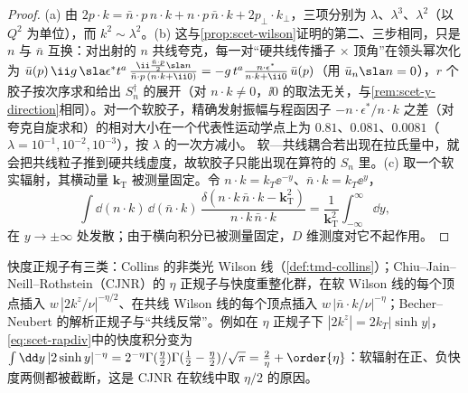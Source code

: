 \begin{proof}
(a) 由 $2p\cdot k=\bar n\cdot p\,n\cdot k+n\cdot p\,\bar n\cdot k+2p_\perp\cdot k_\perp$，三项分别为 $\lambda$、$\lambda^3$、$\lambda^2$（以 $Q^2$ 为单位），而 $k^2\sim\lambda^2$。(b) 这与\cref{prop:scet-wilson}证明的第二、三步相同，只是 $n$ 与 $\bar n$ 互换：对出射的 $n$ 共线夸克，每一对“硬共线传播子 × 顶角”在领头幂次化为 $\bar u(p)\,\ii g\,\sla\epsilon^*t^a\,\frac{\ii\frac{\bar n\cdot p}{2}\sla n}{\bar n\cdot p\,(n\cdot k+\ii0)}=-g\,t^a\frac{n\cdot\epsilon^*}{n\cdot k+\ii0}\,\bar u(p)$（用 $\bar u_n\sla n=0$），$r$ 个胶子按次序求和给出 $S_n^\dagger$ 的展开（对 $n\cdot k\neq0$，$\ii0$ 的取法无关，与\cref{rem:scet-y-direction}相同）。对一个软胶子，精确发射振幅与程函因子 $-n\cdot\epsilon^*/n\cdot k$ 之差（对夸克自旋求和）的相对大小在一个代表性运动学点上为 $0.81$、$0.081$、$0.0081$（$\lambda=10^{-1},10^{-2},10^{-3}$），按 $\lambda$ 的一次方减小。%
软—共线耦合若出现在拉氏量中，就会把共线粒子推到硬共线虚度，故软胶子只能出现在算符的 $S_n$ 里。(c) 取一个软实辐射，其横动量 $\bm k_{\mathrm T}$ 被测量固定。令 $n\cdot k=k_T\ee^{-y}$、$\bar n\cdot k=k_T\ee^{y}$，
\begin{equation}\label{eq:scet-rapdiv}
\int\dd(n\cdot k)\,\dd(\bar n\cdot k)\,\frac{\delta(n\cdot k\,\bar n\cdot k-\bm k_{\mathrm T}^2)}{n\cdot k\,\bar n\cdot k}=\frac{1}{\bm k_{\mathrm T}^2}\int_{-\infty}^{\infty}\dd y ,
\end{equation}
在 $y\to\pm\infty$ 处发散；由于横向积分已被测量固定，$D$ 维测度对它不起作用。
\end{proof}

快度正规子有三类：Collins 的非类光 Wilson 线（\cref{def:tmd-collins}）；Chiu--Jain--Neill--Rothstein（CJNR）的 $\eta$ 正规子与快度重整化群\cite{ChiuEtAl2012a,ChiuEtAl2012b}，在软 Wilson 线的每个顶点插入 $w\,|2k^z/\nu|^{-\eta/2}$、在共线 Wilson 线的每个顶点插入 $w\,|\bar n\cdot k/\nu|^{-\eta}$；Becher--Neubert 的解析正规子与“共线反常”\cite{BecherNeubert2011}。例如在 $\eta$ 正规子下 $|2k^z|=2k_T|\sinh y|$，\cref{eq:scet-rapdiv}中的快度积分变为 $\int\dd y\,|2\sinh y|^{-\eta}=2^{-\eta}\Gamma(\tfrac\eta2)\Gamma(\tfrac12-\tfrac\eta2)/\sqrt\pi=\tfrac2\eta+\order{\eta}$：软辐射在正、负快度两侧都被截断，这是 CJNR 在软线中取 $\eta/2$ 的原因\cite{ChiuEtAl2012a}。%

